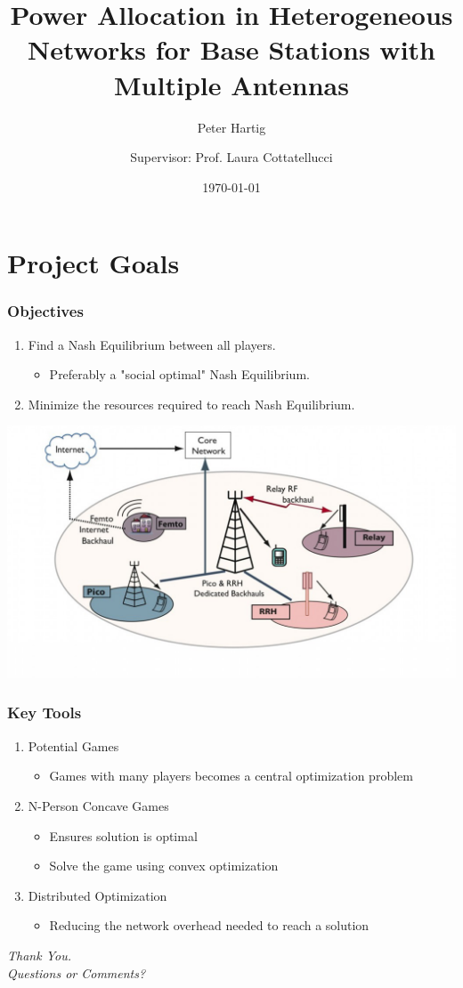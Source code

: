 \documentclass[10pt,tgadventor, onlymath]{beamer}
\title{\large \bfseries Power Allocation in Heterogeneous Networks for Base Stations with Multiple Antennas}
\author{Peter Hartig \\ \and Supervisor: Prof. Laura  Cottatellucci
}
\date{\today}
\begin{document}
\frame{
\thispagestyle{empty}
\titlepage
}

\section{Project Goals}

\begin{frame}
\frametitle{Objectives}
\begin{enumerate}
\setlength\itemsep{2em}
\item Find a Nash Equilibrium between all players.
\begin{itemize}
\item Preferably a "social optimal" Nash Equilibrium.
\end{itemize}
\item Minimize the resources required to reach Nash Equilibrium.
\end{enumerate}
\begin{center}
		\includegraphics[scale=.2]{het_net}
\end{center}
\end{frame}
\begin{frame}
\frametitle{Key Tools}
\begin{enumerate}
\setlength\itemsep{2em}

\item 
Potential Games 
\begin{itemize}
\item
Games with many players becomes a central optimization problem
\end{itemize}
\item 
N-Person Concave Games
\begin{itemize}
\item
Ensures solution is optimal
\item
Solve the game using convex optimization
\end{itemize}
\item 
Distributed Optimization
\begin{itemize}
\item
Reducing the network overhead needed to reach a solution
\end{itemize}
\end{enumerate}
\end{frame}

\begin{frame}
  \centering \Large
  \emph{Thank You.}
  \\
	\bigskip
    \centering \Large
  \emph{Questions or Comments?}
\end{frame}
\end{document}

